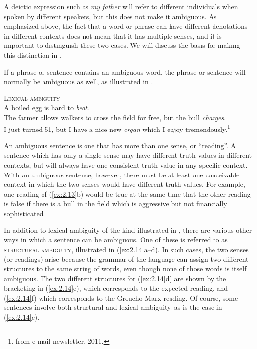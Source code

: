 A deictic expression such as \textit{my father} will refer to different individuals when spoken by different speakers, but this does not make it ambiguous. As emphasized above, the fact that a word or phrase can have different denotations in different contexts does not mean that it has multiple senses, and it is important to distinguish these two cases. We will discuss the basis for making this distinction in .



If a phrase or sentence contains an ambiguous word, the phrase or sentence will normally be ambiguous as well, as illustrated in .


\ea \label{ex:2.13}
\textsc{Lexical ambiguity}\\
\ea A boiled egg is hard to \textit{beat}.\\
\ex The farmer allows walkers to cross the field for free, but the bull \textit{charges}.\\
\ex I just turned 51, but I have a nice new \textit{organ} which I enjoy tremendously.\footnote{from e-mail newsletter, 2011.}
                       \z
\z


An ambiguous sentence is one that has more than one sense, or “reading”. A sentence which has only a single sense may have different truth values in different contexts, but will always have one consistent truth value in any specific context. With an ambiguous sentence, however, there must be at least one conceivable context in which the two senses would have different truth values. For example, one reading of (\ref{ex:2.13}b) would be true at the same time that the other reading is false if there is a bull in the field which is aggressive but not financially sophisticated.



In addition to lexical ambiguity of the kind illustrated in , there are various other ways in which a sentence can be ambiguous. One of these is referred to as \textsc{structural ambiguity}, illustrated in (\ref{ex:2.14}a--d). In such cases, the two senses (or readings) arise because the grammar of the language can assign two different structures to the same string of words, even though none of those words is itself ambiguous. The two different structures for (\ref{ex:2.14}d) are shown by the bracketing in (\ref{ex:2.14}e), which corresponds to the expected reading, and (\ref{ex:2.14}f) which corresponds to the Groucho Marx reading. Of course, some sentences involve both structural and lexical ambiguity, as is the case in (\ref{ex:2.14}c).


